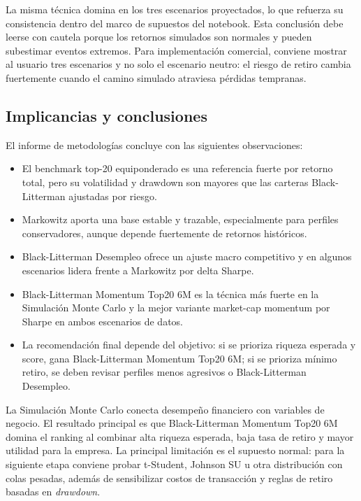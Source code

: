 La misma t\'ecnica domina en los tres escenarios proyectados, lo que refuerza su
consistencia dentro del marco de supuestos del notebook. Esta conclusi\'on debe
leerse con cautela porque los retornos simulados son normales y pueden
subestimar eventos extremos. Para implementaci\'on comercial, conviene mostrar al
usuario tres escenarios y no solo el escenario neutro: el riesgo de retiro cambia
fuertemente cuando el camino simulado atraviesa p\'erdidas tempranas.

\subsection*{Implicancias y conclusiones}

El informe de metodolog\'ias concluye con las siguientes observaciones:

\begin{itemize}
    \item El benchmark top-20 equiponderado es una referencia fuerte por retorno
    total, pero su volatilidad y drawdown son mayores que las carteras
    Black-Litterman ajustadas por riesgo.
    \item Markowitz aporta una base estable y trazable, especialmente para
    perfiles conservadores, aunque depende fuertemente de retornos hist\'oricos.
    \item Black-Litterman Desempleo ofrece un ajuste macro competitivo y en
    algunos escenarios lidera frente a Markowitz por delta Sharpe.
    \item Black-Litterman Momentum Top20 6M es la t\'ecnica m\'as fuerte en la
    Simulaci\'on Monte Carlo y la mejor variante market-cap momentum por Sharpe
    en ambos escenarios de datos.
    \item La recomendaci\'on final depende del objetivo: si se prioriza riqueza
    esperada y score, gana Black-Litterman Momentum Top20 6M; si se prioriza
    m\'inimo retiro, se deben revisar perfiles menos agresivos o
    Black-Litterman Desempleo.
\end{itemize}

La Simulaci\'on Monte Carlo conecta desempe\~no financiero con variables de
negocio. El resultado principal es que Black-Litterman Momentum Top20 6M domina
el ranking al combinar alta riqueza esperada, baja tasa de retiro y mayor
utilidad para la empresa. La principal limitaci\'on es el supuesto normal: para
la siguiente etapa conviene probar t-Student, Johnson SU u otra distribuci\'on
con colas pesadas, adem\'as de sensibilizar costos de transacci\'on y reglas de
retiro basadas en \textit{drawdown}.

